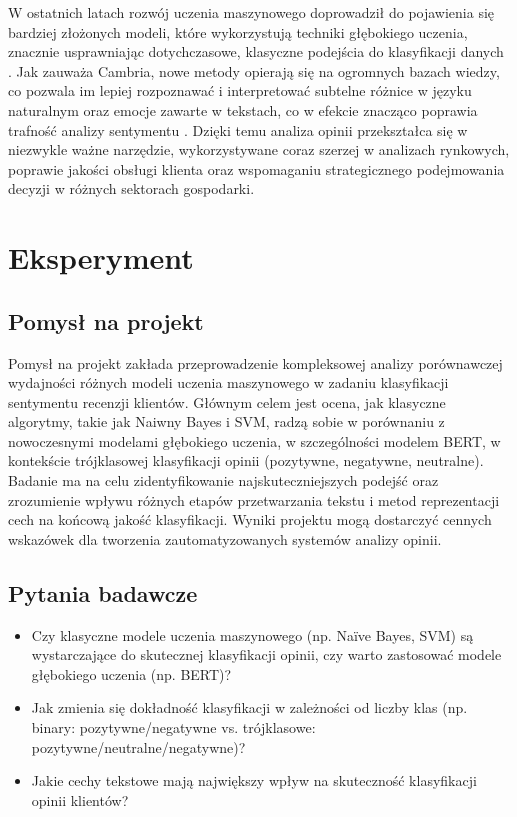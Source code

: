 \documentclass[runningheads]{llncs}
\begin{document}
W ostatnich latach rozwój uczenia maszynowego doprowadził do pojawienia się bardziej złożonych modeli, które wykorzystują techniki głębokiego uczenia, znacznie usprawniając dotychczasowe, klasyczne podejścia do klasyfikacji danych \cite{10.1155/2016/6965725}\cite{10.30534/ijeter/2020/46822020}. Jak zauważa Cambria, nowe metody opierają się na ogromnych bazach wiedzy, co pozwala im lepiej rozpoznawać i interpretować subtelne różnice w języku naturalnym oraz emocje zawarte w tekstach, co w efekcie znacząco poprawia trafność analizy sentymentu \cite{10.1109/mis.2013.30}. Dzięki temu analiza opinii przekształca się w niezwykle ważne narzędzie, wykorzystywane coraz szerzej w analizach rynkowych, poprawie jakości obsługi klienta oraz wspomaganiu strategicznego podejmowania decyzji w różnych sektorach gospodarki.

\section{Eksperyment}

\subsection{Pomysł na projekt}
Pomysł na projekt zakłada przeprowadzenie kompleksowej analizy porównawczej wydajności różnych modeli uczenia maszynowego w zadaniu klasyfikacji sentymentu recenzji klientów. Głównym celem jest ocena, jak klasyczne algorytmy, takie jak Naiwny Bayes i SVM, radzą sobie w porównaniu z nowoczesnymi modelami głębokiego uczenia, w szczególności modelem BERT, w kontekście trójklasowej klasyfikacji opinii (pozytywne, negatywne, neutralne). Badanie ma na celu zidentyfikowanie najskuteczniejszych podejść oraz zrozumienie wpływu różnych etapów przetwarzania tekstu i metod reprezentacji cech na końcową jakość klasyfikacji. Wyniki projektu mogą dostarczyć cennych wskazówek dla tworzenia zautomatyzowanych systemów analizy opinii.

\subsection{Pytania badawcze}
\begin{itemize}
    \item Czy klasyczne modele uczenia maszynowego (np. Naïve Bayes, SVM) są wystarczające do skutecznej klasyfikacji opinii, czy warto zastosować modele głębokiego uczenia (np. BERT)?
    \item Jak zmienia się dokładność klasyfikacji w zależności od liczby klas (np. binary: pozytywne/negatywne vs. trójklasowe: pozytywne/neutralne/negatywne)?
    \item Jakie cechy tekstowe mają największy wpływ na skuteczność klasyfikacji opinii klientów?
    
\end{itemize}
\end{document}
